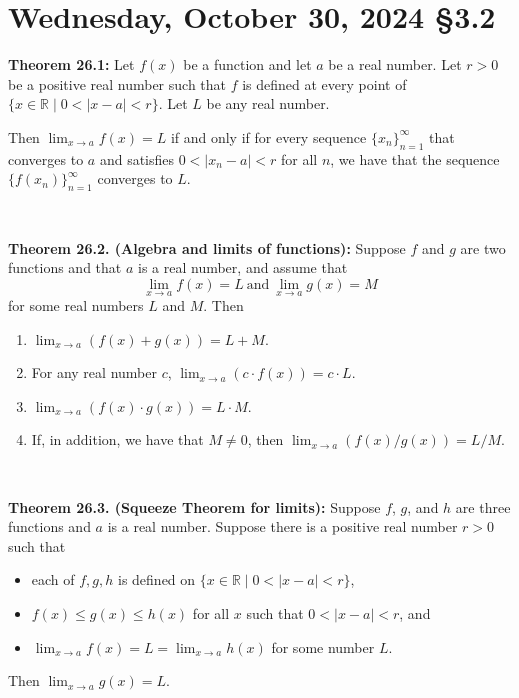 \documentclass[12pt]{amsart}
\def\We{Wednesday}
\newcommand{\R}{{\mathbb{R}}}
\numberwithin{equation}{section}
\theoremstyle{plain} %
\newcommand{\Oct}[3]{\section{#2, October #1, 2024 \quad \S#3}}
\theoremstyle{definition}
\theoremstyle{remark}
\begin{document}
\newpage


\Oct{30}{\We}{3.2}



	\begin{framed}
\noindent \textbf{Theorem 26.1:}  Let $f(x)$ be a function and let $a$ be a real number.
  Let $r > 0$ be a positive real number such that
  $f$ is defined
  at every point of ${\{x \in \R \mid 0 < |x-a| < r\}}$.
    Let $L$ be any real number. 

Then $\lim_{x \to a} f(x) = L$ if and only if for every sequence 
$\{x_n\}_{n=1}^\infty$ that converges to $a$ and satisfies $0 < |x_n - a| < r$ for all $n$, we have that the sequence $\{f(x_n)\}_{n=1}^\infty$ converges to $L$. 

\
	
	\noindent \textbf{Theorem 26.2. (Algebra and limits of functions):} Suppose $f$ and $g$ are two functions and that $a$ is a real number, and
	assume  that 
	$$
	\lim_{x \to a} f(x) = L  \ \text{and} \  \lim_{x \to a} g(x) = M
	$$
	for some real numbers $L$ and $M$. Then
	\begin{enumerate}
		\item $\lim_{x \to a} (f(x) + g(x)) = L  + M$.
		\item For any real number $c$, $\lim_{x \to a} (c \cdot f(x)) = c \cdot L$.
		\item $\lim_{x \to a} (f(x) \cdot g(x)) = L \cdot M$.
		\item If, in addition, we have that $M \ne 0$,
		then $\lim_{x \to a} (f(x)/g(x)) = L/M$.
	\end{enumerate}
	
	\
	
	\noindent \textbf{Theorem 26.3. (Squeeze Theorem for limits):} Suppose $f$, $g$, and $h$ are three functions and $a$ is a real number. Suppose there is a positive real number $r > 0$
	such that 
	\begin{itemize}
		\item each of $f,g,h$ is defined on $\{x \in \R \mid 0 < |x-a| < r\}$,
		\item $f(x) \leq g(x) \leq h(x)$ for all
		$x$ such that $0 < |x-a| < r$, and
		\item	$\lim_{x \to a} f(x) = L = \lim_{x \to    a} h(x)$ for some number $L$.
	\end{itemize}  
	Then $\lim_{x \to a} g(x) = L$.
\end{framed}	
	
\end{document}
